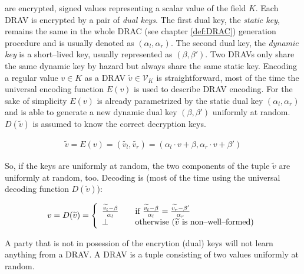  are encrypted, signed values
representing a scalar value of the field $K$. Each DRAV is encrypted by a pair
of \emph{dual keys}. The first dual key, the \emph{static key}, remains the same
in the whole DRAC (see chapter \ref{def:DRAC}) generation procedure and is
usually denoted as $(\alpha_l, \alpha_r)$. The second dual key, the
\emph{dynamic key} is a short--lived key, usually represented as $(\beta,
\beta')$. Two DRAVs only share the same dynamic key by hazard but always share
the same static key. Encoding a regular value $v \in K$ as a DRAV
$\widetilde{v} \in \mathcal{V}_K$ is straightforward, most of the time the
universal encoding function $E(v)$ is used to describe DRAV encoding. For the
sake of simplicity $E(v)$ is already parametrized by the static dual key
$(\alpha_l, \alpha_r)$ and is able to generate a new dynamic dual key $(\beta,
\beta')$ uniformly at random. $D(\widetilde{v})$ is assumed to know the correct
decryption keys.

\begin{align*}
  \widetilde{v} = E(v) = (\widetilde{v_l}, \widetilde{v_r}) =
    (\alpha_l \cdot v + \beta, \alpha_r \cdot v + \beta')
\end{align*}

\noindent{}So, if the keys are uniformly at random, the two components of the
tuple $\widetilde{v}$ are uniformly at random, too. Decoding is (most of the
time using the universal decoding function $D(\widetilde{v})$):

\begin{align*}
  v = D(\widetilde{v}) =
  \left\{
    \begin{array}{l l}
      \frac{\widetilde{v_l} - \beta}{\alpha_l} & \quad
      \text{if}~\frac{\widetilde{v_l} - \beta}{\alpha_l} =
      \frac{\widetilde{v_r} - \beta'}{\alpha_r}\\
      \bot & \quad \text{otherwise ($\widetilde{v}$ is non--well--formed)}\\
    \end{array}\right.
\end{align*}

\begin{lem}
  \label{lem:DRAV-random}

  A party that is not in posession of the encrytion (dual) keys will not learn
  anything from a DRAV. A DRAV is a tuple consisting of two values uniformly at
  random.

\end{lem}

